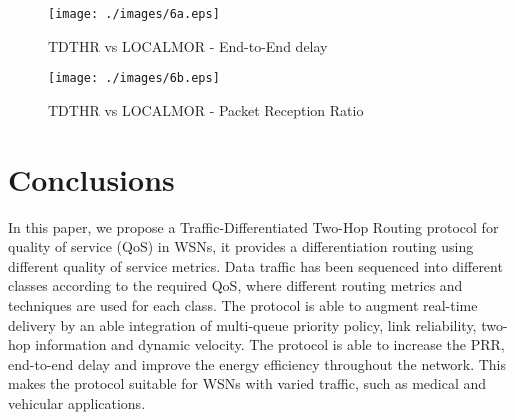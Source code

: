 \documentclass[fleqn,twoside]{article}
\begin{document}
\begin{figure}
\centering
\texttt{[image: ./images/6a.eps]}
\caption{TDTHR vs LOCALMOR - End-to-End delay}
\end{figure}

\begin{figure}
\centering
\texttt{[image: ./images/6b.eps]}
\caption{TDTHR vs LOCALMOR - Packet Reception Ratio}
\end{figure}
 
 \section{Conclusions}
\label{section:conclusions}

In this paper, we propose a Traffic-Differentiated Two-Hop Routing protocol for quality of service (QoS) in WSNs, it provides a
differentiation routing using different quality of service metrics.
Data traffic has been sequenced into different classes according to the required QoS, where different routing metrics and techniques are used for each class. 
The protocol is able to augment real-time delivery by an able integration of multi-queue priority policy, 
link reliability, two-hop information and dynamic velocity. The protocol is able to increase the PRR, end-to-end delay and improve
the energy efficiency throughout the network. This makes the protocol suitable for WSNs with varied traffic, such
as medical and vehicular applications.
 \small
\balance
\end{document}
